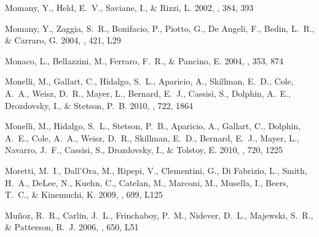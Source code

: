 \documentclass[manuscript]{aastex}
\begin{document}
\begin{thebibliography}{381}
{Momany}, Y., {Held}, E.~V., {Saviane}, I., \& {Rizzi}, L. 2002, \aap, 384, 393

{Momany}, Y., {Zaggia}, S.~R., {Bonifacio}, P., {Piotto}, G., {De Angeli}, F.,
  {Bedin}, L.~R., \& {Carraro}, G. 2004, \aap, 421, L29

{Monaco}, L., {Bellazzini}, M., {Ferraro}, F.~R., \& {Pancino}, E. 2004,
  \mnras, 353, 874

{Monelli}, M., {Gallart}, C., {Hidalgo}, S.~L., {Aparicio}, A., {Skillman},
  E.~D., {Cole}, A.~A., {Weisz}, D.~R., {Mayer}, L., {Bernard}, E.~J.,
  {Cassisi}, S., {Dolphin}, A.~E., {Drozdovsky}, I., \& {Stetson}, P.~B.
  2010{}, \apj, 722, 1864

{Monelli}, M., {Hidalgo}, S.~L., {Stetson}, P.~B., {Aparicio}, A., {Gallart},
  C., {Dolphin}, A.~E., {Cole}, A.~A., {Weisz}, D.~R., {Skillman}, E.~D.,
  {Bernard}, E.~J., {Mayer}, L., {Navarro}, J.~F., {Cassisi}, S., {Drozdovsky},
  I., \& {Tolstoy}, E. 2010{}, \apj, 720, 1225

{Moretti}, M.~I., {Dall'Ora}, M., {Ripepi}, V., {Clementini}, G., {Di
  Fabrizio}, L., {Smith}, H.~A., {DeLee}, N., {Kuehn}, C., {Catelan}, M.,
  {Marconi}, M., {Musella}, I., {Beers}, T.~C., \& {Kinemuchi}, K. 2009, \apjl,
  699, L125

{Mu{\~n}oz}, R.~R., {Carlin}, J.~L., {Frinchaboy}, P.~M., {Nidever}, D.~L.,
  {Majewski}, S.~R., \& {Patterson}, R.~J. 2006, \apjl, 650, L51


\end{thebibliography}
\end{document}
